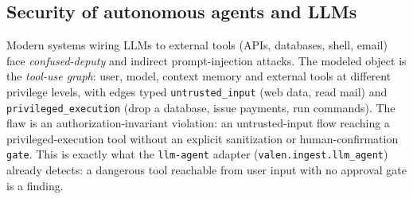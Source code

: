 \documentclass[11pt]{article}
\begin{document}
\subsection{Security of autonomous agents and LLMs}
Modern systems wiring LLMs to external tools (APIs, databases, shell, email)
face \emph{confused-deputy} and indirect prompt-injection attacks. The modeled
object is the \emph{tool-use graph}: user, model, context memory and external
tools at different privilege levels, with edges typed \texttt{untrusted\_input}
(web data, read mail) and \texttt{privileged\_execution} (drop a database, issue
payments, run commands). The flaw is an authorization-invariant violation: an
untrusted-input flow reaching a privileged-execution tool without an explicit
sanitization or human-confirmation \texttt{gate}. This is exactly what the
\texttt{llm-agent} adapter (\texttt{valen.ingest.llm\_agent}) already
detects: a dangerous tool reachable from user input with no approval gate is a
finding.
\end{document}

